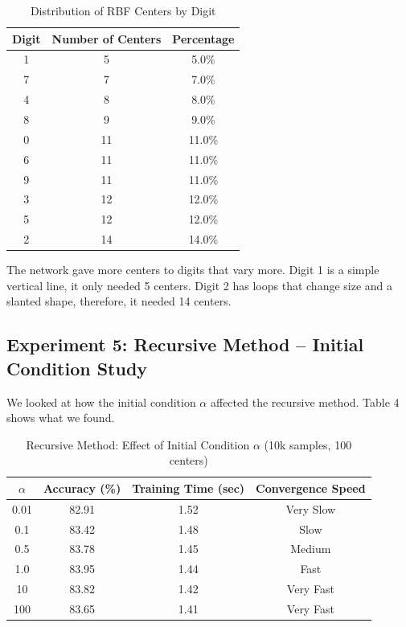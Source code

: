 \documentclass[12pt]{article}
\begin{document}
\begin{table}[H]
	\centering
	\caption{Distribution of RBF Centers by Digit}
	\begin{tabular}{ccc}
		\toprule
		\textbf{Digit} & \textbf{Number of Centers} & \textbf{Percentage} \\
		\midrule
		1 & 5 & 5.0\% \\
		7 & 7 & 7.0\% \\
		4 & 8 & 8.0\% \\
		8 & 9 & 9.0\% \\
		0 & 11 & 11.0\% \\
		6 & 11 & 11.0\% \\
		9 & 11 & 11.0\% \\
		3 & 12 & 12.0\% \\
		5 & 12 & 12.0\% \\
		2 & 14 & 14.0\% \\
		\bottomrule
	\end{tabular}
\end{table}

The network gave more centers to digits that vary more. Digit 1 is a simple vertical line, it only needed 5 centers. Digit 2 has loops that change size and a slanted shape, therefore, it needed 14 centers.

	\subsection{Experiment 5: Recursive Method – Initial Condition Study}
	
	We looked at how the initial condition $\alpha$ affected the recursive method. Table 4 shows what we found.
	
	\begin{table}[H]
		\centering
		\caption{Recursive Method: Effect of Initial Condition $\alpha$ (10k samples, 100 centers)}
		\begin{tabular}{cccc}
			\toprule
			$\alpha$ & \textbf{Accuracy (\%)} & \textbf{Training Time (sec)} & \textbf{Convergence Speed} \\
			\midrule
			0.01 & 82.91 & 1.52 & Very Slow \\
			0.1 & 83.42 & 1.48 & Slow \\
			0.5 & 83.78 & 1.45 & Medium \\
			1.0 & 83.95 & 1.44 & Fast \\
			10 & 83.82 & 1.42 & Very Fast \\
			100 & 83.65 & 1.41 & Very Fast \\
			\bottomrule
		\end{tabular}
	\end{table}
	
\end{document}
